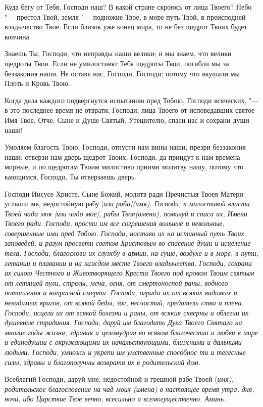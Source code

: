 Куда бегу от Тебя, Господи наш? В какой стране скроюсь от лица Твоего? Небо "--- престол Твой, земля "--- подножие Твое, в море путь Твой, в преисподней владычество Твое. Если близок уже конец мира, то не без щедрот Твоих будет кончина. 

Знаешь Ты, Господи, что неправды наши велики; и мы знаем, что велики щедроты Твои. Если не умилостивят Тебя щедроты Твои, погибли мы за беззакония наши. Не оставь нас, Господи, Господи; потому что вкушали мы Плоть и Кровь Твою. 

Когда дела каждого подвергнутся испытанию пред Тобою, Господи всяческих, "--- в это последнее время не отврати, Господи, лица Твоего от исповедавших святое Имя Твое. Отче, Сыне и Душе Святый, Утешителю, спаси нас и сохрани души наши! 

Умоляем благость Твою, Господи, отпусти нам вины наши, презри беззакония наши; отверзи нам дверь щедрот Твоих, Господи, да приидут к нам времена мирные, и по щедротам Твоим милостиво приими молитву нашу, потому что кающимся, Господи, Ты отверзаешь дверь.


\mychapterending

 


Господи Иисусе Христе, Сыне Божий, молитв ради Пречистыя Твоея Матери услыши мя, недостойную рабу [\itshape или\normalfont{} раба]\itshape  (имя).\normalfont{} Господи, в милостивой власти Твоей чада моя [\itshape или\normalfont{} чадо мое], рабы Твоя\itshape  (имена),\normalfont{} помилуй и спаси их, Имени Твоего ради. Господи, прости им все согрешения вольные и невольные, совершенные ими пред Тобою. Господи, настави их на истинный путь Твоих заповедей, и разум просвети светом Христовым во спасение души и исцеление тела. Господи, благослови их службу в армии, на суше, воздухе и в море, в пути, летании и плавании и на каждом месте Твоего владычества. Господи, сохрани их силою Честного и Животворящего Креста Твоего под кровом Твоим святым от летящей пули, стрелы, меча, огня, от смертоносной раны, водного потопления и напрасной смерти. Господи, огради их от всяких видимых и невидимых врагов, от всякой беды, зол, несчастий, предатель ства и плена. Господи, исцели их от всякой болезни и раны, от всякия скверны и облегчи их душевные страдания. Господи, даруй им благодать Духа Твоего Святаго на многие годы жизни, здравия и целомудрия во всяком благочестии и любви в мире и единодушии с окружающими их начальствующими, ближними и дальними людьми. Господи, умножь и укрепи им умственные способнос ти и телесные силы, здравы и благополучны возврати их в родительский дом. 

Всеблагий  Господи, даруй мне, недостойной и грешной рабе Твоей (\itshape имя\normalfont{}), родительское благословение на чад моих (\itshape имена\normalfont{}) в настоящее время утра, дня, ночи, ибо Царствие Твое вечно, всесильно и всемогущественно. Аминь. 





\mychapterending